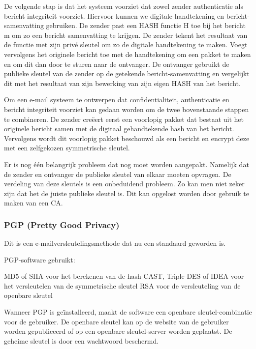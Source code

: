 \noindent De volgende stap is dat het systeem voorziet dat zowel zender authenticatie als bericht integriteit voorziet. Hiervoor kunnen we digitale handtekening en bericht-samenvatting gebruiken. De zender past een HASH functie H toe bij het bericht m om zo een bericht samenvatting te krijgen. De zender tekent het resultaat van de functie met zijn privé sleutel om zo de digitale handtekening te maken. Voegt vervolgens het originele bericht toe met de handtekening om een pakket te maken en om dit dan door te sturen naar de ontvanger. De ontvanger gebruikt de publieke sleutel van de zender op de getekende bericht-samenvatting en vergelijkt dit met het resultaat van zijn bewerking van zijn eigen HASH van het bericht.

\noindent Om een e-mail systeem te ontwerpen dat confidentialiteit, authenticatie en bericht integriteit voorziet kan gedaan worden om de twee bovenstaande stappen te combineren. De zender creëert eerst een voorlopig pakket dat bestaat uit het originele bericht samen met de digitaal gehandtekende hash van het bericht. Vervolgens wordt dit voorlopig pakket beschouwd als een bericht en encrypt deze met een zelfgekozen symmetrische sleutel.

\noindent Er is nog één belangrijk probleem dat nog moet worden aangepakt. Namelijk dat de zender en ontvanger de publieke sleutel van elkaar moeten opvragen. De verdeling van deze sleutels is een onbeduidend probleem. Zo kan men niet zeker zijn dat het de juiste publieke sleutel is. Dit kan opgelost worden door gebruik te maken van een CA.

\subsubsection{PGP (Pretty Good Privacy)}

\fra  Dit is een e-mailversleutelingsmethode dat nu een standaard geworden is.

\noindent PGP-software gebruikt:

\bi
\itf MD5 of SHA voor het berekenen van de hash
\itf CAST, Triple-DES of IDEA voor het versleutelen van de symmetrische sleutel
\itf RSA voor de versleuteling van de openbare sleutel
\ei
	
\noindent Wanneer PGP is geïnstalleerd, maakt de software een openbare sleutel-combinatie voor de gebruiker. De openbare sleutel kan op de website van de gebruiker worden gepubliceerd of op een openbare sleutel-server worden geplaatst. De geheime sleutel is door een wachtwoord beschermd.

